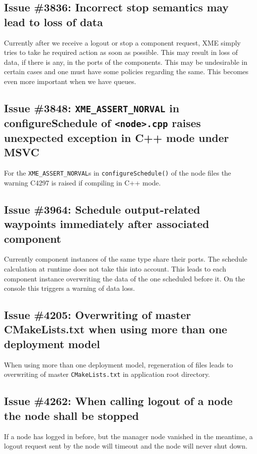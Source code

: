 \subsection{Issue \#3836: Incorrect stop semantics may lead to loss of data}

Currently after we receive a logout or stop a component request, XME simply tries to take he required action as soon as possible.
This may result in loss of data, if there is any, in the ports of the components.
This may be undesirable in certain cases and one must have some policies regarding the same.
This becomes even more important when we have queues.

\subsection{Issue \#3848: \texttt{XME\_ASSERT\_NORVAL} in configureSchedule of \texttt{<node>.cpp} raises unexpected exception in C++ mode under MSVC}

For the \texttt{XME\_ASSERT\_NORVAL}s in \texttt{configureSchedule()} of the node files the warning C4297 is raised if compiling in C++ mode.

\subsection{Issue \#3964: Schedule output-related waypoints immediately after associated component}

Currently component instances of the same type share their ports.
The schedule calculation at runtime does not take this into account.
This leads to each component instance overwriting the data of the one scheduled before it.
On the console this triggers a warning of data loss.

\subsection{Issue \#4205: Overwriting of master CMakeLists.txt when using more than one deployment model}

When using more than one deployment model, regeneration of files leads to overwriting of master \texttt{CMakeLists.txt} in application root directory.

\subsection{Issue \#4262: When calling logout of a node the node shall be stopped}

If a node has logged in before, but the manager node vanished in the meantime,
a logout request sent by the node will timeout and the node will never shut down.
